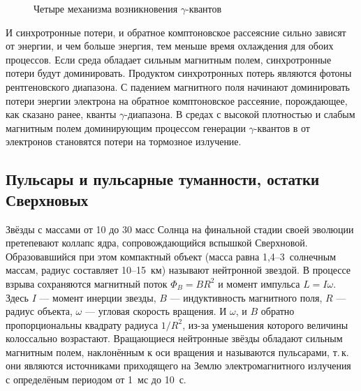\documentclass[magd,floatypics,numeref]{msudipl} %
\begin{document}
\begin{figure}[th]
	\noindent{}
	\caption{Четыре механизма возникновения $\gamma$-квантов}
	\label{pic:four_mechanisms}
\end{figure}

И синхротронные потери, и обратное комптоновское рассеясние сильно зависят от энергии, и чем больше энергия, тем меньше время охлаждения для обоих процессов.  Если среда обладает сильным магнитным полем, синхротронные потери будут доминировать. Продуктом синхротронных потерь являются фотоны рентгеновского диапазона. С падением магнитного поля начинают доминировать потери энергии электрона на обратное комптоновское рассеяние, порождающее, как сказано ранее, кванты $\gamma$-диапазона. 
В средах с высокой плотностью и слабым магнитным полем доминирующим процессом генерации $\gamma$-квантов в от электронов становятся потери на тормозное излучение. 
\subsection{Пульсары и пульсарные туманности, остатки Сверхновых}
Звёзды с массами от 10 до 30 масс Солнца на финальной стадии своей эволюции претепевают коллапс ядра, сопровождающийся вспышкой Сверхновой. Образовавшийся при этом компактный объект (масса равна 1,4--3~солнечным массам, радиус составляет 10--15~км) называют нейтронной звездой. В процессе взрыва сохраняются магнитный поток $\Phi_B=BR^2$ и момент импульса $L = I\omega$. Здесь $I$ --- момент инерции звезды, $B$ --- индуктивность магнитного поля, $R$ --- радиус объекта, $\omega$ --- угловая скорость вращения. И $\omega$, и $B$ обратно пропорциональны квадрату радиуса $1/R^2$, из-за уменьшения которого  величины колоссально возрастают. Вращающиеся нейтронные звёзды обладают сильным магнитным полем, наклонённым к оси вращения и называются пульсарами, т.\,к. они являются источниками приходящего на Землю электромагнитного излучения с определёным периодом от 1~мс до 10~с. 
\end{document}
